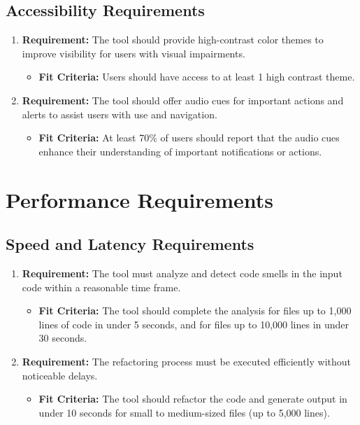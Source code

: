 \documentclass[12pt]{article}
\begin{document}
\subsection{Accessibility Requirements}
\begin{enumerate}
  \item \textbf{Requirement:} The tool should provide high-contrast color themes to improve visibility for users with visual impairments.
  \begin{itemize}[label={}]
      \item \textbf{Fit Criteria:} Users should have access to at least 1 high contrast theme.
  \end{itemize}
  \item \textbf{Requirement:} The tool should offer audio cues for important actions and alerts to assist users with use and navigation.
  \begin{itemize}[label={}]
      \item \textbf{Fit Criteria:} At least 70\% of users should report that the audio cues enhance their understanding of important notifications or actions.
  \end{itemize}
\end{enumerate}

\section{Performance Requirements}
\subsection{Speed and Latency Requirements}
\begin{enumerate}
  \item \textbf{Requirement:} The tool must analyze and detect code smells in the input code within a reasonable time frame.
  \begin{itemize}[label={}]
      \item \textbf{Fit Criteria:} The tool should complete the analysis for files up to 1,000 lines of code in under 5 seconds, and for files up to 10,000 lines in under 30 seconds.
  \end{itemize}
  \item \textbf{Requirement:} The refactoring process must be executed efficiently without noticeable delays.
  \begin{itemize}[label={}]
      \item \textbf{Fit Criteria:} The tool should refactor the code and generate output in under 10 seconds for small to medium-sized files (up to 5,000 lines).
  \end{itemize}
\end{enumerate}
\end{document}

